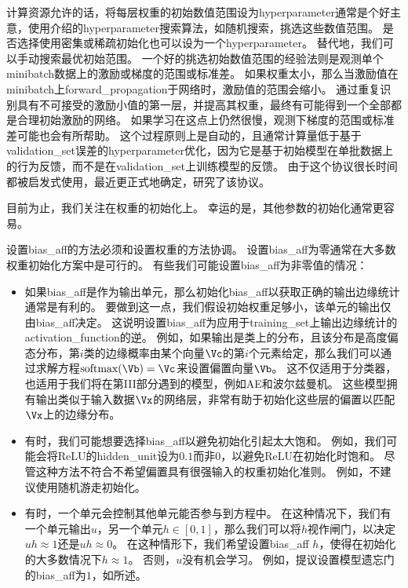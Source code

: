 计算资源允许的话，将每层权重的初始数值范围设为\gls{hyperparameter}通常是个好主意，使用介绍的\gls{hyperparameter}搜索算法，如随机搜索，挑选这些数值范围。
是否选择使用密集或稀疏初始化也可以设为一个\gls{hyperparameter}。
替代地，我们可以手动搜索最优初始范围。
一个好的挑选初始数值范围的经验法则是观测单个\gls{minibatch}数据上的激励或梯度的范围或标准差。
如果权重太小，那么当激励值在\gls{minibatch}上\gls{forward_propagation}于网络时，激励值的范围会缩小。
通过重复识别具有不可接受的激励小值的第一层，并提高其权重，最终有可能得到一个全部都是合理初始激励的网络。
如果学习在这点上仍然很慢，观测下梯度的范围或标准差可能也会有所帮助。
这个过程原则上是自动的，且通常计算量低于基于\gls{validation_set}误差的\gls{hyperparameter}优化，因为它是基于初始模型在单批数据上的行为反馈，而不是在\gls{validation_set}上训练模型的反馈。
由于这个协议很长时间都被启发式使用，最近\cite{mishkin2015all}更正式地确定，研究了该协议。


目前为止，我们关注在权重的初始化上。
幸运的是，其他参数的初始化通常更容易。


设置\gls{bias_aff}的方法必须和设置权重的方法协调。
设置\gls{bias_aff}为零通常在大多数权重初始化方案中是可行的。
有些我们可能设置\gls{bias_aff}为非零值的情况：

\begin{itemize}
\item 如果\gls{bias_aff}是作为输出单元，那么初始化\gls{bias_aff}以获取正确的输出边缘统计通常是有利的。
要做到这一点，我们假设初始权重足够小，该单元的输出仅由\gls{bias_aff}决定。
这说明设置\gls{bias_aff}为应用于\gls{training_set}上输出边缘统计的\gls{activation_function}的逆。
例如，如果输出是类上的分布，且该分布是高度偏态分布，第$i$类的边缘概率由某个向量$\Vc$的第$i$个元素给定，那么我们可以通过求解方程$\text{softmax}(\Vb)=\Vc$来设置偏置向量$\Vb$。
这不仅适用于分类器，也适用于我们将在第III部分遇到的模型，例如\gls{AE}和波尔兹曼机。
这些模型拥有输出类似于输入数据$\Vx$的网络层，非常有助于初始化这些层的偏置以匹配$\Vx$上的边缘分布。


\item 有时，我们可能想要选择\gls{bias_aff}以避免初始化引起太大饱和。
例如，我们可能会将ReLU的\gls{hidden_unit}设为$0.1$而非$0$，以避免ReLU在初始化时饱和。
尽管这种方法不符合不希望偏置具有很强输入的权重初始化准则。
例如，不建议使用随机游走初始化\citep{Sussillo14}。


\item 有时，一个单元会控制其他单元能否参与到方程中。
在这种情况下，我们有一个单元输出$u$，另一个单元$h\in[0,1]$，那么我们可以将$h$视作闸门，以决定$uh\approx 1$还是$uh\approx 0$。
在这种情形下，我们希望设置\gls{bias_aff} $h$，使得在初始化的大多数情况下$h\approx 1$。
否则，$u$没有机会学习。
例如，\cite{Jozefowicz-et-al-ICML2015}提议设置模型遗忘门的\gls{bias_aff}为$1$，如所述。
\end{itemize}


